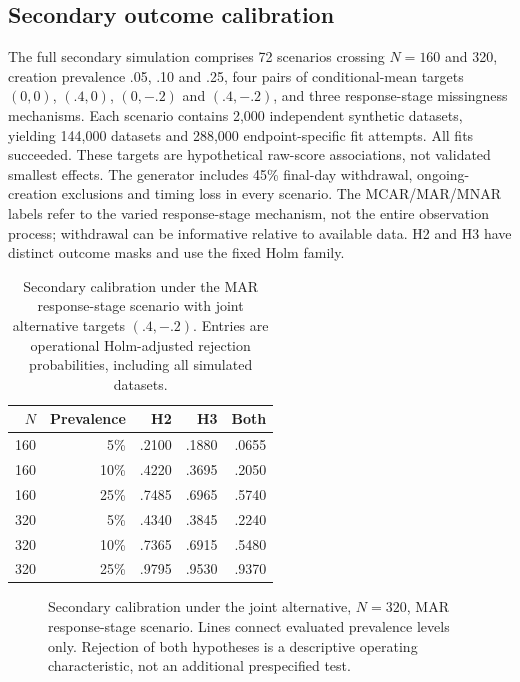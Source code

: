 \documentclass[11pt]{article}
\begin{document}
\subsection{Secondary outcome calibration}
The full secondary simulation comprises 72 scenarios crossing $N=160$ and 320, creation prevalence .05, .10 and .25, four pairs of conditional-mean targets $(0,0)$, $(.4,0)$, $(0,-.2)$ and $(.4,-.2)$, and three response-stage missingness mechanisms. Each scenario contains 2,000 independent synthetic datasets, yielding 144,000 datasets and 288,000 endpoint-specific fit attempts. All fits succeeded. These targets are hypothetical raw-score associations, not validated smallest effects. The generator includes 45\% final-day withdrawal, ongoing-creation exclusions and timing loss in every scenario. The MCAR/MAR/MNAR labels refer to the varied response-stage mechanism, not the entire observation process; withdrawal can be informative relative to available data. H2 and H3 have distinct outcome masks and use the fixed Holm family.

\begin{table}[htbp]
\centering\small
\caption{Secondary calibration under the MAR response-stage scenario with joint alternative targets $(.4,-.2)$. Entries are operational Holm-adjusted rejection probabilities, including all simulated datasets.}
\label{tab:secondary-power}
\begin{tabular}{@{}rrrrr@{}}
\toprule
$N$ & Prevalence & H2 & H3 & Both\\
\midrule
160 & 5\% & .2100 & .1880 & .0655\\
160 & 10\% & .4220 & .3695 & .2050\\
160 & 25\% & .7485 & .6965 & .5740\\
320 & 5\% & .4340 & .3845 & .2240\\
320 & 10\% & .7365 & .6915 & .5480\\
320 & 25\% & .9795 & .9530 & .9370\\
\bottomrule
\end{tabular}
\end{table}

\begin{figure}[htbp]
\centering

\caption{Secondary calibration under the joint alternative, $N=320$, MAR response-stage scenario. Lines connect evaluated prevalence levels only. Rejection of both hypotheses is a descriptive operating characteristic, not an additional prespecified test.}
\label{fig:secondary-power}
\end{figure}
\end{document}
